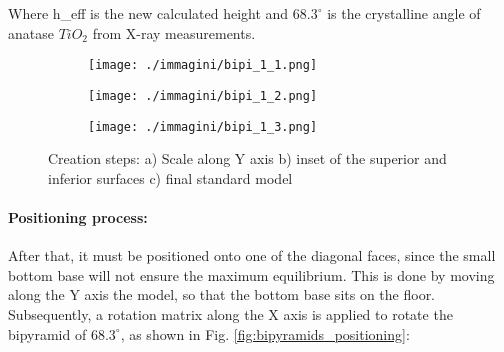 Where h\_eff is the new calculated height and $68.3^{\circ}$ is the crystalline angle of anatase $TiO_2$ from X-ray measurements.

\begin{figure}[ht]
    \centering
    \begin{subfigure}[b]{0.3\textwidth}
        \texttt{[image: ./immagini/bipi\_1\_1.png]}
        \caption{}
        \label{fig:bipyramids_process1}
    \end{subfigure}
    \hfill
    \begin{subfigure}[b]{0.3\textwidth}
        \texttt{[image: ./immagini/bipi\_1\_2.png]}
        \caption{}
        \label{fig:bipyramids_process2}
    \end{subfigure}
    \hfill
    \begin{subfigure}[b]{0.3\textwidth}
        \texttt{[image: ./immagini/bipi\_1\_3.png]}
        \caption{}
        \label{fig:bipyramids_process3}
    \end{subfigure}
    \caption{Creation steps: a) Scale along Y axis b) inset of the superior and inferior surfaces c) final standard model}
    \label{fig:bipyramids_process}
\end{figure}

\paragraph{Positioning process: }

After that, it must be positioned onto one of the diagonal faces, since the small bottom base will not ensure the maximum equilibrium. This is done by moving along the Y axis the model, so that the bottom base sits on the floor. Subsequently, a rotation matrix along the X axis is applied to rotate the bipyramid of $68.3^{\circ}$, as shown in Fig. \ref{fig:bipyramids_positioning}:

